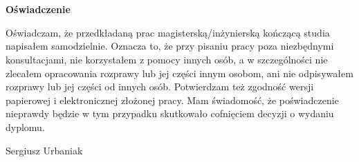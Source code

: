 \chapter*{}

\vspace{1 cm}
\begin{center}                        
\LARGE{ \bf{Oświadczenie}} \\
\end{center}
Oświadczam, że przedkładaną prac magisterską/inżynierską kończącą studia napisałem samodzielnie. Oznacza to, że przy pisaniu pracy poza niezbędnymi konsultacjami, nie korzystałem z pomocy innych osób, a w szczególności nie zlecałem opracowania rozprawy lub jej części innym osobom, ani nie odpisywałem rozprawy lub jej części od innych osób. Potwierdzam też zgodność wersji papierowej i elektronicznej złożonej pracy. Mam świadomość, że poświadczenie nieprawdy będzie w tym przypadku skutkowało cofnięciem decyzji o wydaniu dyplomu.
\vspace{3.0cm}
\begin{flushleft}
\hspace{10.0 cm}     Sergiusz Urbaniak\\
\end{flushleft}

\normalsize
